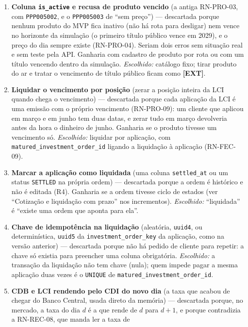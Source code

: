 \documentclass[11pt,a4paper]{article}
\newcommand{\ext}{\textbf{[EXT]}}          %
\newcommand{\tb}[1]{\texttt{#1}}           %
\begin{document}
\begin{enumerate}
  regra, erro e testes novos. Ganharia se quiséssemos oferecer uma ``carteira de reserva de
  emergência'' a qualquer perfil. \emph{Escolhido:} a sugestão é sempre a do perfil atual.
  \item \textbf{Coluna \tb{is_active} e recusa de produto vencido} (a antiga RN-PRO-03, com
  \tb{PPP005002}, e o \tb{PPP005003} de ``sem preço'') --- descartada porque nenhum produto do MVP
  fica inativo (não há rota para desligar) nem vence no horizonte da simulação (o primeiro título
  público vence em 2029), e o preço do dia sempre existe (RN-PRO-04). Seriam dois erros sem
  situação real e sem teste pela API. Ganharia com cadastro de produto por rota ou com um título
  vencendo dentro da simulação. \emph{Escolhido:} catálogo fixo; tirar produto do ar e tratar o
  vencimento de título público ficam como \ext.
  \item \textbf{Liquidar o vencimento por posição} (zerar a posição inteira da LCI quando chega o
  vencimento) --- descartada porque cada aplicação da LCI é uma emissão com o próprio vencimento
  (RN-PRO-09): um cliente que aplicou em março e em junho tem duas datas, e zerar tudo em março
  devolveria antes da hora o dinheiro de junho. Ganharia se o produto tivesse um vencimento só.
  \emph{Escolhido:} liquidar por aplicação, com \tb{matured_investment_order_id} ligando a liquidação à
  aplicação (RN-FEC-09).
  \item \textbf{Marcar a aplicação como liquidada} (uma coluna \tb{settled_at} ou um status
  \tb{SETTLED} na própria ordem) --- descartada porque a ordem é histórico e não é editada (R4).
  Ganharia se a ordem tivesse ciclo de estados (ver ``Cotização e liquidação com prazo'' nos
  incrementos). \emph{Escolhido:} ``liquidada'' é ``existe uma ordem que aponta para ela''.
  \item \textbf{Chave de idempotência na liquidação} (aleatória, \tb{uuid4}, ou determinística,
  \tb{uuid5} da \tb{investment_order_key} da aplicação, como na versão anterior) --- descartada porque não há
  pedido de cliente para repetir: a chave só existia para preencher uma coluna obrigatória.
  \emph{Escolhido:} a transação da liquidação não tem chave (nula); quem impede pagar a mesma
  aplicação duas vezes é o \tb{UNIQUE} de \tb{matured_investment_order_id}.
  \item \textbf{CDB e LCI rendendo pelo CDI do novo dia} (a taxa que acabou de chegar do Banco
  Central, usada direto da memória) --- descartada porque, no mercado, a taxa do dia $d$ é a que
  rende de $d$ para $d+1$, e porque contradizia a RN-REC-08, que manda ler a taxa de

\end{enumerate}
\end{document}
